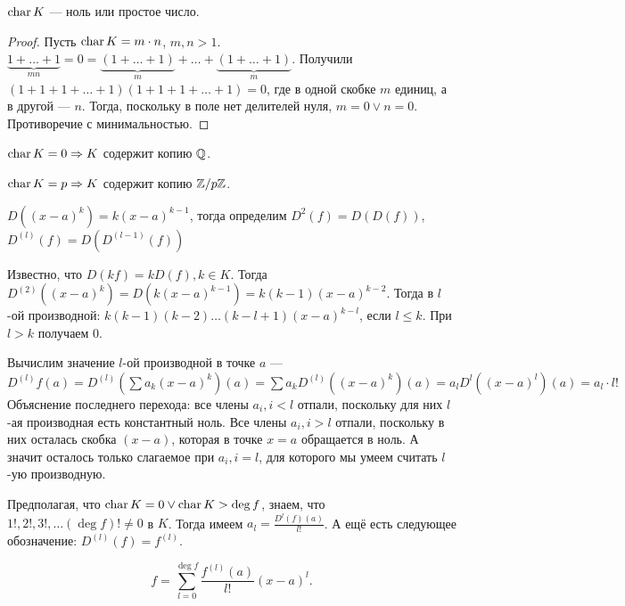  \begin{lemma}
    $\operatorname{char} K$ --- ноль или простое число.
\end{lemma}
\begin{proof}
    Пусть $\operatorname{char} K = m \cdot n$,  $m, n > 1$.  $\underbrace{1+\ldots+1}_{mn} = 0 = \underbrace{(1 + \ldots + 1)}_m + \ldots + \underbrace{(1 + \ldots + 1)}_m$. Получили $(1 + 1 + 1 + \ldots + 1)(1 + 1 + 1 + \ldots + 1) = 0$, где в одной скобке $m$ единиц, а в другой ---  $n$. Тогда, поскольку в поле нет делителей нуля, $m = 0 \lor n = 0$. Противоречие с минимальностью.
\end{proof}
\begin{consequence}
    $\operatorname{char} K = 0 \Rightarrow K$ содержит копию $\mathbb{Q}$.

     $\operatorname{char} K = p \Rightarrow K$ содержит копию  $\mathbb{Z} / p \mathbb{Z}$.
\end{consequence}
$D((x-a)^k) = k (x-a)^{k-1}$, тогда определим $D^2(f) = D(D(f))$, $D^{(l)}(f) = D(D^{(l - 1)}(f))$

Известно, что  $D(kf) = kD(f), k \in K$. Тогда  $D^{(2)}((x-a)^k) = D(k(x-a)^{k-1}) = k(k-1)(x-a)^{k-2}$. Тогда в  $l$-ой производной:  $k(k-1)(k-2)\ldots(k - l + 1)(x-a)^{k-l}$, если $l \le k$. При $l > k$ получаем 0.

Вычислим значение  $l$-ой производной в точке  $a$ --- $D^{(l)}f(a) = D^{(l)}\left(\sum a_k(x-a)^k\right)(a) = \sum a_kD^{(l)}((x-a)^k)(a) = a_l D^{l}((x-a)^l)(a) = a_l \cdot l!$ Объяснение последнего перехода: все члены $a_i, i < l$ отпали, поскольку для них $l$-ая производная есть константный ноль. Все члены $a_i, i > l$ отпали, поскольку в них осталась скобка $(x-a)$, которая в точке $x=a$ обращается в ноль. А значит осталось только слагаемое при $a_i, i = l$, для которого мы умеем считать $l$-ую производную.

Предполагая, что $\operatorname{char} K = 0 \lor \operatorname{char} K > \deg f$, знаем, что $1!, 2!, 3!, \ldots (\deg f)! \neq 0$ в $K$. Тогда имеем $a_l = \frac{D^{l}(f)(a)}{l!}$. А ещё есть следующее обозначение: $D^{(l)}(f) = f^{(l)}$.
\begin{theorem}
    \[
        f = \sum_{l=0}^{\deg f} \frac{f^{(l)}(a)}{l!}(x-a)^l
    .\] 
\end{theorem}
